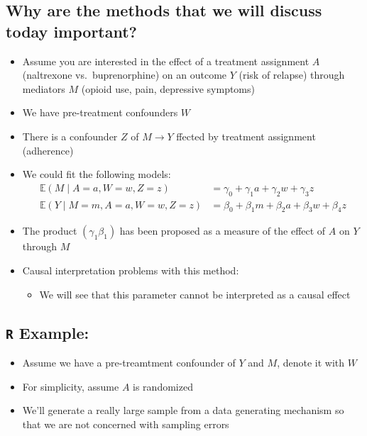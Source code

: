 \documentclass[
  12pt,
]{book}
\providecommand{\tightlist}{%
  \setlength{\itemsep}{0pt}\setlength{\parskip}{0pt}}
\theoremstyle{definition}
\theoremstyle{definition}
\theoremstyle{definition}
\newcommand{\E}{\mathbb{E}}
\newcommand{\1}{\mathbbm{1}}
\begin{document}
\hypertarget{why-are-the-methods-that-we-will-discuss-today-important}{%
\subsection{Why are the methods that we will discuss today important?}\label{why-are-the-methods-that-we-will-discuss-today-important}}

\begin{itemize}
\tightlist
\item
  Assume you are interested in the effect of a treatment assignment \(A\)
  (naltrexone vs.~buprenorphine) on an outcome \(Y\) (risk of relapse) through
  mediators \(M\) (opioid use, pain, depressive symptoms)
\item
  We have pre-treatment confounders \(W\)
\item
  There is a confounder \(Z\) of \(M\rightarrow Y\) ffected by treatment assignment
  (adherence)
\item
  We could fit the following models:
  \begin{align}
      \E(M\mid A=a, W=w, Z=z) & = \gamma_0 + \gamma_1 a + \gamma_2 w + \gamma_3 z \\
      \E(Y\mid M=m, A=a, W=w, Z=z) & = \beta_0 + \beta_1 m + \beta_2 a + \beta_3 w + \beta_4 z
    \end{align}
\item
  The product \((\gamma_1\beta_1)\) has been proposed as a measure of the effect
  of \(A\) on \(Y\) through \(M\)
\item
  Causal interpretation problems with this method:

  \begin{itemize}
  \tightlist
  \item
    We will see that this parameter cannot be interpreted as a causal effect
  \end{itemize}
\end{itemize}

\hypertarget{r-example}{%
\subsection{\texorpdfstring{\texttt{R} Example:}{R Example:}}\label{r-example}}

\begin{itemize}
\tightlist
\item
  Assume we have a pre-treamtment confounder of \(Y\) and \(M\), denote it with \(W\)
\item
  For simplicity, assume \(A\) is randomized
\item
  We'll generate a really large sample from a data generating mechanism so that
  we are not concerned with sampling errors
\end{itemize}
\end{document}
